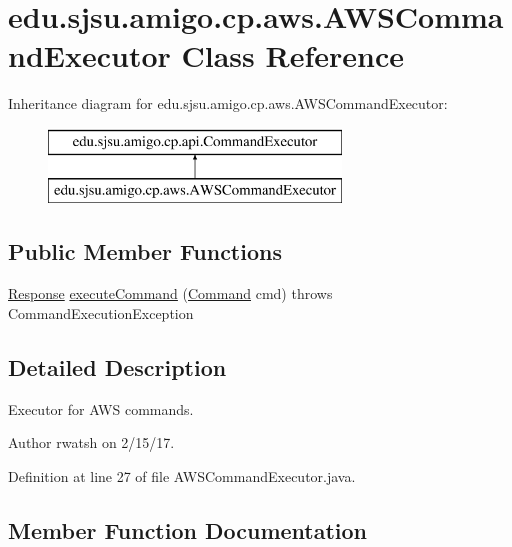 \hypertarget{classedu_1_1sjsu_1_1amigo_1_1cp_1_1aws_1_1_a_w_s_command_executor}{}\section{edu.\+sjsu.\+amigo.\+cp.\+aws.\+A\+W\+S\+Command\+Executor Class Reference}
\label{classedu_1_1sjsu_1_1amigo_1_1cp_1_1aws_1_1_a_w_s_command_executor}
Inheritance diagram for edu.\+sjsu.\+amigo.\+cp.\+aws.\+A\+W\+S\+Command\+Executor\+:\begin{figure}[H]
\begin{center}
\leavevmode
\includegraphics[height=2.000000cm]{classedu_1_1sjsu_1_1amigo_1_1cp_1_1aws_1_1_a_w_s_command_executor}
\end{center}
\end{figure}
\subsection*{Public Member Functions}
\begin{DoxyCompactItemize}
\item 
\hyperlink{classedu_1_1sjsu_1_1amigo_1_1cp_1_1api_1_1_response}{Response} \hyperlink{classedu_1_1sjsu_1_1amigo_1_1cp_1_1aws_1_1_a_w_s_command_executor_adea0b25883968832b0a44d9a368c3875}{execute\+Command} (\hyperlink{classedu_1_1sjsu_1_1amigo_1_1cp_1_1api_1_1_command}{Command} cmd)  throws Command\+Execution\+Exception 
\end{DoxyCompactItemize}


\subsection{Detailed Description}
Executor for A\+WS commands.

\begin{DoxyAuthor}{Author}
rwatsh on 2/15/17. 
\end{DoxyAuthor}


Definition at line 27 of file A\+W\+S\+Command\+Executor.\+java.



\subsection{Member Function Documentation}
\mbox{\label{classedu_1_1sjsu_1_1amigo_1_1cp_1_1aws_1_1_a_w_s_command_executor_adea0b25883968832b0a44d9a368c3875}} 
